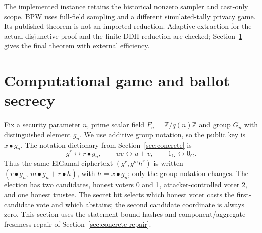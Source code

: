 \documentclass[11pt]{article}
\begin{document}
The implemented instance retains the historical nonzero sampler and cast-only
scope. BPW uses full-field sampling and a different simulated-tally privacy
game. Its published theorem is not an imported reduction. Adaptive extraction
for the actual disjunctive proof and the finite DDH reduction are checked;
Section~\ref{sec:computational-final} gives the final theorem with external efficiency.

\section{Computational game and ballot secrecy}\label{sec:computational-final}
Fix a security parameter $n$, prime scalar field $F_n=\mathbb Z/q(n)\mathbb Z$
and group $G_n$ with distinguished element $g_n$. We use additive group notation, so the
public key is $x\mathbin{\bullet}g_n$. The notation dictionary from
Section~\ref{sec:concrete} is
\[
  g^r \longleftrightarrow r\mathbin{\bullet}g_n,
  \qquad uv \longleftrightarrow u+v, \qquad 1_G \longleftrightarrow 0_G.
\]
Thus the same ElGamal ciphertext $(g^r,g^m h^r)$ is written
$(r\mathbin{\bullet}g_n,\,m\mathbin{\bullet}g_n+r\mathbin{\bullet}h)$,
with $h=x\mathbin{\bullet}g_n$; only the group notation changes.
The election has two candidates, honest
voters 0 and 1, attacker-controlled voter 2, and one honest trustee. The secret
bit selects which honest voter casts the first-candidate vote and which abstains;
the second candidate coordinate is always zero. This section uses the
statement-bound hashes and component/aggregate freshness repair of
Section~\ref{sec:concrete-repair}.
\end{document}

